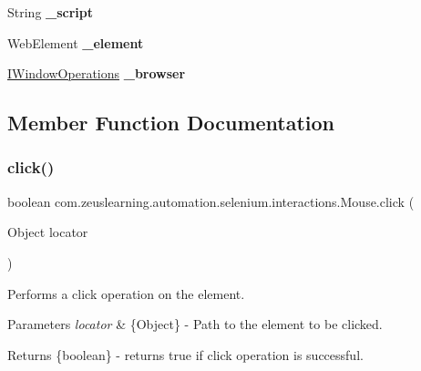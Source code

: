 \begin{DoxyCompactItemize}
String {\bfseries \+\_\+script}
\item 
\hypertarget{classcom_1_1zeuslearning_1_1automation_1_1selenium_1_1interactions_1_1Mouse_adbe86c79dd833e01cf913c9f3ddd2a37}{}\label{classcom_1_1zeuslearning_1_1automation_1_1selenium_1_1interactions_1_1Mouse_adbe86c79dd833e01cf913c9f3ddd2a37} 
Web\+Element {\bfseries \+\_\+element}
\item 
\hypertarget{classcom_1_1zeuslearning_1_1automation_1_1selenium_1_1interactions_1_1Mouse_a0e84237d5aa19854050283d958847727}{}\label{classcom_1_1zeuslearning_1_1automation_1_1selenium_1_1interactions_1_1Mouse_a0e84237d5aa19854050283d958847727} 
\hyperlink{interfacecom_1_1zeuslearning_1_1automation_1_1interactions_1_1IWindowOperations}{I\+Window\+Operations} {\bfseries \+\_\+browser}
\end{DoxyCompactItemize}


\subsection{Member Function Documentation}
\hypertarget{classcom_1_1zeuslearning_1_1automation_1_1selenium_1_1interactions_1_1Mouse_a60a08540de50836519b5a6e2b0dc40fe}{}\label{classcom_1_1zeuslearning_1_1automation_1_1selenium_1_1interactions_1_1Mouse_a60a08540de50836519b5a6e2b0dc40fe} 
\subsubsection{\texorpdfstring{click()}{click()}\hspace{0.1cm}{\footnotesize\ttfamily [1/2]}}
{\footnotesize\ttfamily boolean com.\+zeuslearning.\+automation.\+selenium.\+interactions.\+Mouse.\+click (\begin{DoxyParamCaption}\item[{Object}]{locator }\end{DoxyParamCaption})\hspace{0.3cm}{\ttfamily [inline]}}

Performs a click operation on the element.


\begin{DoxyParams}{Parameters}
{\em locator} & \{Object\} -\/ Path to the element to be clicked.\\
\hline
\end{DoxyParams}
\begin{DoxyReturn}{Returns}
\{boolean\} -\/ returns {\ttfamily true} if click operation is successful. 
\end{DoxyReturn}


